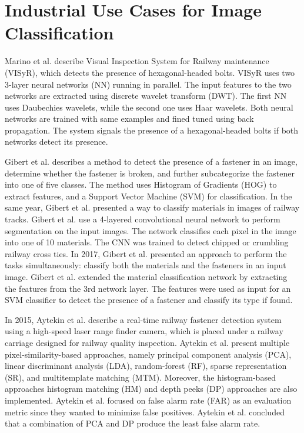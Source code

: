 \section{Industrial Use Cases for Image Classification}\label{sec:industrial_usecases}

Marino et al. \cite{marino2007real} \cite{de2009gpu} describe Visual Inspection System for Railway maintenance (VISyR), which detects the presence of hexagonal-headed bolts. VISyR uses two 3-layer neural networks (NN) running in parallel. The input features to the two networks are extracted using discrete wavelet transform (DWT). The first NN uses Daubechies wavelets, while the second one uses Haar wavelets. Both neural networks are trained with same examples and fined tuned using back propagation. The system signals the presence of a hexagonal-headed bolts if both networks detect its presence. 

Gibert et al. \cite{gibert2015robust} describes a method to detect the presence of a fastener in an image, determine whether the fastener is broken, and further subcategorize the fastener into one of five classes. The method uses Histogram of Gradients (HOG) to extract features, and a Support Vector Machine (SVM) for classification. In the same year, Gibert et al. \cite{gibert2015material} presented a way to classify materials in images of railway tracks. Gibert et al. use a 4-layered convolutional neural network to perform segmentation on the input images. The network classifies each pixel in the image into one of 10 materials. The CNN was trained to detect chipped or crumbling railway cross ties. In 2017, Gibert et al. \cite{gibert2017deep} presented an approach to perform the tasks simultaneously: classify both the materials and the fasteners in an input image. Gibert et al. extended the material classification network \cite{gibert2015material} by extracting the features from the 3rd network layer. The features were used as input for an SVM classifier to detect the presence of a fastener and classify its type if found.

In 2015, Aytekin et al. \cite{aytekin2015railway} describe a real-time railway fastener detection system using a high-speed laser range finder camera, which is placed under a railway carriage designed for railway quality inspection. Aytekin et al. present multiple pixel-similarity-based approaches, namely principal component analysis (PCA), linear discriminant analysis (LDA), random-forest (RF), sparse representation (SR), and multitemplate matching (MTM). Moreover, the histogram-based approaches histogram matching (HM) and depth peeks (DP) approaches are also implemented. Aytekin et al. focused on false alarm rate (FAR) as an evaluation metric since they wanted to minimize false positives. Aytekin et al. concluded that a combination of PCA and DP produce the least false alarm rate.

